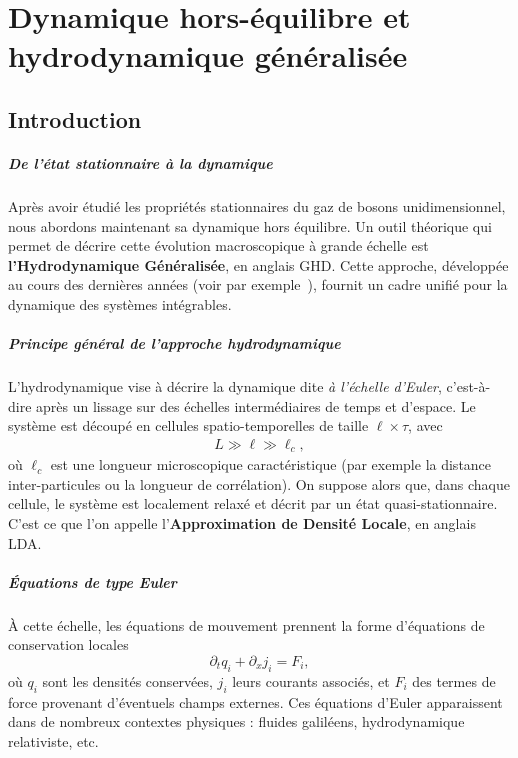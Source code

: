 \chapter{Dynamique hors-équilibre et hydrodynamique généralisée}
\label{chap:GHD}
\minitoc

\section*{Introduction}

\paragraph{De l’état stationnaire à la dynamique}  
Après avoir étudié les propriétés stationnaires du gaz de bosons unidimensionnel, nous abordons maintenant sa dynamique hors équilibre. Un outil théorique qui permet de décrire cette évolution macroscopique à grande échelle est {\bf l’Hydrodynamique Généralisée}, en anglais \gls{GHD}. Cette approche, développée au cours des dernières années (voir par exemple~\cite{Doyon_GHD_2020,Bouchoule_2022,ESSLER2023127572,kerr2023theory}), fournit un cadre unifié pour la dynamique des systèmes intégrables.

\paragraph{Principe général de l’approche hydrodynamique}  
L’hydrodynamique vise à décrire la dynamique dite \emph{à l’échelle d’Euler}, c’est-à-dire après un lissage sur des échelles intermédiaires de temps et d’espace. Le système est découpé en cellules spatio-temporelles de taille $\ell \times \tau$, avec
\begin{eqnarray*}
	L \gg \ell \gg \ell_c,	
\end{eqnarray*}
où $\ell_c$ est une longueur microscopique caractéristique (par exemple la distance inter-particules ou la longueur de corrélation). On suppose alors que, dans chaque cellule, le système est localement relaxé et décrit par un état quasi-stationnaire. C’est ce que l’on appelle l’{\bf Approximation de Densité Locale}, en anglais \gls{LDA}.

\paragraph{Équations de type Euler}  
À cette échelle, les équations de mouvement prennent la forme d’équations de conservation locales
\begin{equation}\label{chap:GHD:eq.conserv.1}
	\partial_t q_i + \partial_x j_i = F_i,
\end{equation}
où $q_i$ sont les densités conservées, $j_i$ leurs courants associés, et $F_i$ des termes de force provenant d’éventuels champs externes.  
Ces équations d’Euler apparaissent dans de nombreux contextes physiques : fluides galiléens, hydrodynamique relativiste, etc.

